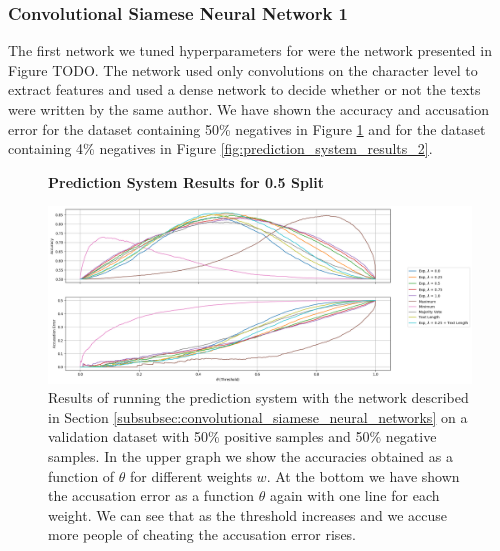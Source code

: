 \subsubsection{Convolutional Siamese Neural Network 1}

The first network we tuned hyperparameters for were the network presented
in Figure TODO. The network used only convolutions on the character level
to extract features and used a dense network to decide whether or not
the texts were written by the same author. We have shown the accuracy
and accusation error for the dataset containing 50\% negatives in Figure
\ref{fig:prediction_system_results_1} and for the dataset containing 4\%
negatives in Figure \ref{fig:prediction_system_results_2}.

\begin{figure}
    \centering
    \textbf{Prediction System Results for 0.5 Split}\par\medskip
    \includegraphics[width=\textwidth]{./pictures/experiments/Prediction_Network3_50.png}
    \caption{Results of running the prediction system with the network described
        in Section \ref{subsubsec:convolutional_siamese_neural_networks} on a
        validation dataset with 50\% positive samples and 50\% negative samples.
        In the upper graph we show the accuracies obtained as a function of
        $\theta$ for different weights $w$. At the bottom we have shown the
        accusation error as a function $\theta$ again with one line for each
        weight. We can see that as the threshold increases and we accuse more
        people of cheating the accusation error rises.}
    \label{fig:prediction_system_results_1}
\end{figure}


